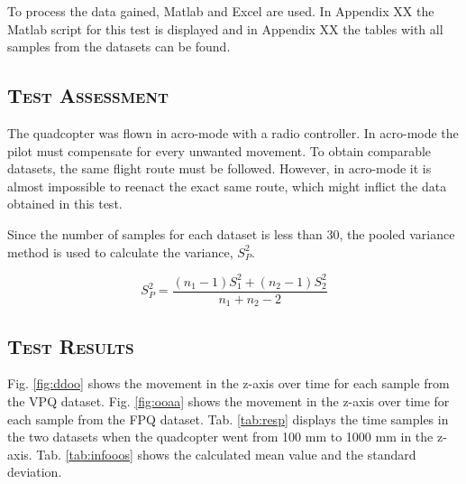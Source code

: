To process the data gained, Matlab and Excel are used. In Appendix XX the Matlab script for this test is displayed and in Appendix XX the tables with all samples from the datasets can be found.

\subsection{\textsc{\medium Test Assessment}}
The quadcopter was flown in acro-mode with a radio controller. In acro-mode the pilot must compensate for every unwanted movement. To obtain comparable datasets, the same flight route must be followed. However, in acro-mode it is almost impossible to reenact the exact same route, which might inflict the data obtained in this test. \bigskip

Since the number of samples for each dataset is less than 30, the pooled variance method is used to calculate the variance, $S_P^2$.

\begin{equation}
\label{eq:interpolert}
S^2_P=\frac{(n_1-1)S^2_1+(n_2-1)S^2_2}{n_1+n_2-2}
\end{equation}

\subsection{\textsc{\medium Test Results}}
Fig. \ref{fig:ddoo} shows the movement in the z-axis over time for each sample from the VPQ dataset. Fig. \ref{fig:ooaa} shows the movement in the z-axis over time for each sample from the FPQ dataset. Tab. \ref{tab:resp} displays the time samples in the two datasets when the quadcopter went from 100 mm to 1000 mm in the z-axis. Tab. \ref{tab:infooos} shows the calculated mean value and the standard deviation. 

